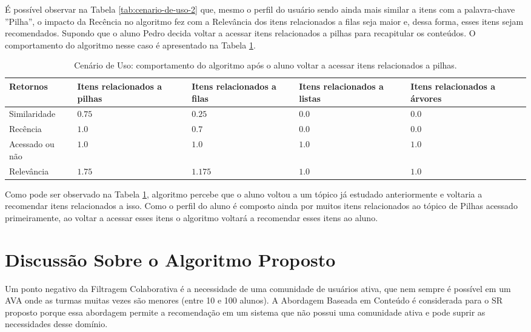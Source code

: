 É possível observar na Tabela \ref{tab:cenario-de-uso-2} que, mesmo o perfil do usuário sendo ainda mais similar a itens
com a palavra-chave ''Pilha'', o impacto da Recência no algoritmo fez com a Relevância dos itens relacionados a filas
seja maior e, dessa forma, esses itens sejam recomendados. Supondo que o aluno Pedro decida voltar a acessar itens
relacionados a pilhas para recapitular os conteúdos. O comportamento do algoritmo nesse caso é apresentado na Tabela
\ref{tab:cenario-de-uso-3}.

\begin{table}[h]
\footnotesize
\caption[Cenário de Uso: comportamento do algoritmo após o aluno voltar a acessar itens relacionados a pilhas.]{Cenário de Uso: comportamento do algoritmo após o aluno voltar a acessar itens relacionados a pilhas.}
\label{tab:cenario-de-uso-3}
\centering
\begin{tabular}{|p{2cm}|p{2.5cm}|p{2.5cm}|p{2.5cm}|p{2.5cm}|}
  \hline
  \textbf{Retornos} & \textbf{Itens relacionados a pilhas} & \textbf{Itens relacionados a filas} & \textbf{Itens relacionados a listas} & \textbf{Itens relacionados a árvores} \\
  \hline
  Similaridade & $0.75$ & $0.25$ & $0.0$ & $0.0$ \\
  \hline
  Recência & $1.0$ & $0.7$ & $0.0$ & $0.0$ \\
  \hline
  Acessado ou não & $1.0$ & $1.0$ & $1.0$ & $1.0$ \\
  \hline
  Relevância & $1.75$ & $1.175$ & $1.0$ & $1.0$ \\
  \hline
\end{tabular}
\end{table}

Como pode ser observado na Tabela \ref{tab:cenario-de-uso-3}, algoritmo percebe que o aluno voltou a um tópico já estudado anteriormente e
voltaria a recomendar itens relacionados a isso. Como o perfil do aluno é composto ainda por muitos itens relacionados ao tópico
de Pilhas acessado primeiramente, ao voltar a acessar esses itens o algoritmo voltará a recomendar esses itens
ao aluno.

\section{Discussão Sobre o Algoritmo Proposto}

Um ponto negativo da Filtragem Colaborativa é a necessidade de uma comunidade de usuários ativa, que nem sempre é
possível em um AVA onde as turmas muitas vezes são menores (entre 10 e 100 alunos). A Abordagem Baseada
em Conteúdo é considerada para o SR proposto porque essa abordagem permite a recomendação em um sistema que não possui uma
comunidade ativa e pode suprir as necessidades desse domínio.

